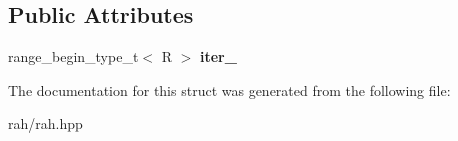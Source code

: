 \subsection*{Public Attributes}
\begin{DoxyCompactItemize}
\item 
\mbox{\label{struct_r_a_h___n_a_m_e_s_p_a_c_e_1_1view_1_1retro__iterator_a610c34a743bd3c125feec7ad1eebbdad}} 
range\+\_\+begin\+\_\+type\+\_\+t$<$ R $>$ {\bfseries iter\+\_\+}
\end{DoxyCompactItemize}


The documentation for this struct was generated from the following file\+:\begin{DoxyCompactItemize}
\item 
rah/rah.\+hpp\end{DoxyCompactItemize}
